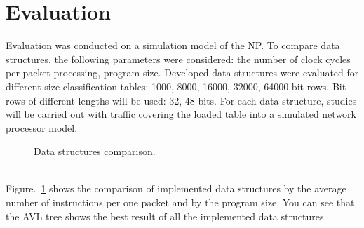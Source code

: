 \documentclass[conference]{IEEEtran}
\begin{document}
    \section{Evaluation}
        Evaluation was conducted on a simulation model of the NP. 
        To compare data structures, the following parameters were considered: 
        the number of clock cycles per packet processing, program size.
        Developed data structures were evaluated for different size classification tables:
        1000, 8000, 16000, 32000, 64000 bit rows. Bit rows of different lengths will be used:
        32, 48 bits. For each data structure, studies will be carried out with traffic 
        covering the loaded table into a simulated network processor model.
        \\
            \begin{figure}
                \centering
                \caption{Data structures comparison.}
                \label{graph:all}
            \end{figure}
            \\
            Figure.~\ref{graph:all} shows the comparison of 
            implemented data structures by the average number of instructions per one packet and
            by the program size.
            You can see that the AVL tree shows the best result of all the implemented data structures.
            
\end{document}
